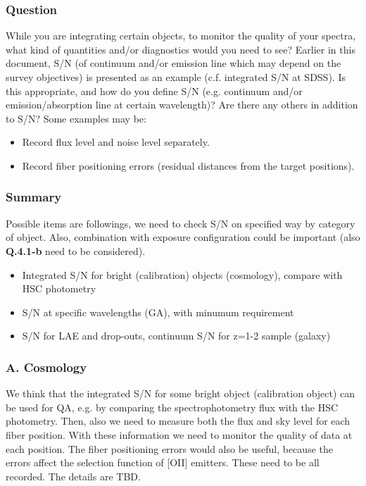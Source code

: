 \documentclass[a4paper,notitlepage]{article}
\begin{document}
\subsubsection{Question}
While you are integrating certain objects, to monitor the
      quality of your spectra, what kind of quantities and/or
      diagnostics would you need to see? Earlier in this document,
      S/N (of continuum and/or emission line which may depend on the
      survey objectives) is presented as an example (c.f. integrated
      S/N at SDSS). Is this appropriate, and how do you define S/N 
      (e.g. continuum and/or emission/absorption line at certain wavelength)? 
      Are there any others in
      addition to S/N? Some examples may be:
      \begin{itemize}
       \item Record flux level and noise level separately.
       \item Record fiber positioning errors (residual distances
         from the target positions).
      \end{itemize}

\subsubsection{Summary}

Possible items are followings, we need to check S/N on specified way by 
category of object. Also, combination with exposure configuration could 
be important (also {\bf Q.4.1-b} need to be considered). 

\begin{itemize}
  \item Integrated S/N for bright (calibration) objects (cosmology), compare with HSC photometry
  \item S/N at specific wavelengths (GA), with minumum requirement
  \item S/N for LAE and drop-outs, continuum S/N for z=1-2 sample (galaxy)
\end{itemize}

\subsubsection{A. Cosmology}
We think that the integrated S/N for some bright object
(calibration object) can be used for QA, e.g. by comparing the
spectrophotometry flux with the HSC photometry. Then, also we need to
measure both the flux and sky level for each fiber position. With
these information we need to monitor the quality of data at each
position. The fiber positioning errors would also be useful, because
the errors affect the selection function of [OII] emitters. These need
to be all recorded. The details are TBD.
\end{document}
